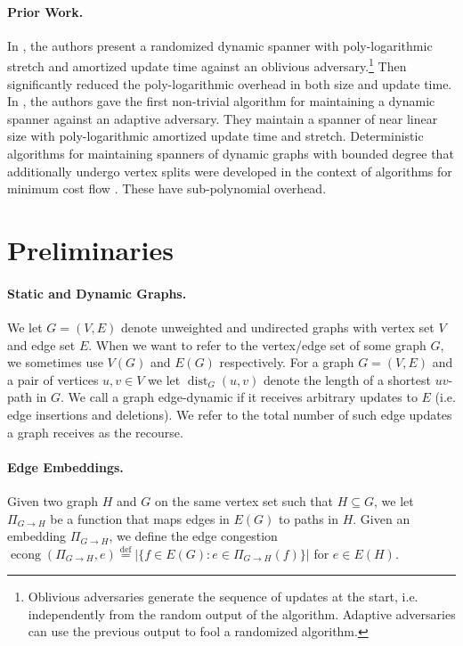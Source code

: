 \documentclass[11pt]{article}
\def\defeq{\stackrel{\mathrm{def}}{=}}
\DeclareMathOperator{\econg}{econg}
\DeclareMathOperator{\dist}{dist}
\begin{document}
\paragraph{Prior Work. } In \cite{rand_spanner}, the authors present a randomized dynamic spanner with poly-logarithmic stretch and amortized update time against an oblivious adversary.\footnote{Oblivious adversaries generate the sequence of updates at the start, i.e. independently from the random output of the algorithm. Adaptive adversaries can use the previous output to fool a randomized algorithm. } Then \cite{forster19} significantly reduced the poly-logarithmic overhead in both size and update time. In \cite{bernstein_et_al:LIPIcs.ICALP.2022.20}, the authors gave the first non-trivial algorithm for maintaining a dynamic spanner against an adaptive adversary. They maintain a spanner of near linear size with poly-logarithmic amortized update time and stretch. Deterministic algorithms for maintaining spanners of dynamic graphs with bounded degree that additionally undergo vertex splits were developed in the context of algorithms for minimum cost flow \cite{maxflow, detmax, CKL24}. These have sub-polynomial overhead.  

\section{Preliminaries}

\paragraph{Static and Dynamic Graphs.} We let $G = (V, E)$ denote unweighted and undirected graphs with vertex set $V$ and edge set $E$. When we want to refer to the vertex/edge set of some graph $G$, we sometimes use $V(G)$ and $E(G)$ respectively. 
For a graph $G = (V, E)$ and a pair of vertices $u,v \in V$ we let $\dist_G(u, v)$ denote the length of a shortest $uv$-path in $G$. 
We call a graph edge-dynamic if it receives arbitrary updates to $E$ (i.e. edge insertions and deletions). We refer to the total number of such edge updates a graph receives as the recourse. 

\paragraph{Edge Embeddings.} Given two graph $H$ and $G$ on the same vertex set such that $H \subseteq G$, we let $\Pi_{G \rightarrow H}$ be a function that maps edges in $E(G)$ to paths in $H$. Given an embedding $\Pi_{G \rightarrow H}$, we define the edge congestion $\econg(\Pi_{G \rightarrow H}, e) \defeq |\{f \in E(G): e \in \Pi_{G \rightarrow H}(f) \}|$ for $e \in E(H)$.
\end{document}
